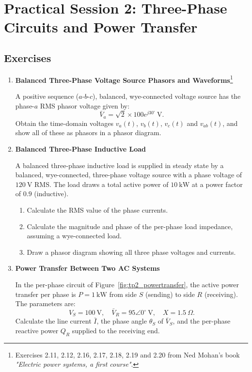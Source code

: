 \section{Practical Session 2: Three-Phase Circuits and Power Transfer}

\subsection{Exercises}
\begin{enumerate}
    \item \textbf{Balanced Three-Phase Voltage Source Phasors and Waveforms}\footnote{Exercises 2.11, 2.12, 2.16, 2.17, 2.18, 2.19 and 2.20 from Ned Mohan's book \textit{"Electric power systems, a first course"}.}
    
    A positive sequence ($a$-$b$-$c$), balanced, wye-connected voltage source has the phase-$a$ RMS phasor voltage given by:
    \[
    \bar{V}_a = \sqrt{2} \times 100 e^{j 30^\circ}\ \text{V}.
    \]
    Obtain the time-domain voltages $v_a(t)$, $v_b(t)$, $v_c(t)$ and $v_{ab}(t)$, and show all of these as phasors in a phasor diagram.

    \item \textbf{Balanced Three-Phase Inductive Load}
    
    A balanced three-phase inductive load is supplied in steady state by a balanced, wye-connected, three-phase voltage source with a phase voltage of $120\ \text{V}$ RMS. The load draws a total active power of $10\ \text{kW}$ at a power factor of $0.9$ (inductive).
    \begin{enumerate}
        \item Calculate the RMS value of the phase currents.
        \item Calculate the magnitude and phase of the per-phase load impedance, assuming a wye-connected load.
        \item Draw a phasor diagram showing all three phase voltages and currents.
    \end{enumerate}

    \item \textbf{Power Transfer Between Two AC Systems}
    
    In the per-phase circuit of Figure~\ref{fig:tp2_powertransfer}, the active power transfer per phase is $P = 1\ \text{kW}$ from side $S$ (sending) to side $R$ (receiving). The parameters are:
    \[
    V_S = 100\ \text{V},\quad \bar{V}_R = 95\angle 0^\circ\ \text{V},\quad X = 1.5\ \Omega.
    \]
    Calculate the line current $\bar{I}$, the phase angle $\theta_S$ of $\bar{V}_S$, and the per-phase reactive power $Q_R$ supplied to the receiving end.


\end{enumerate}
